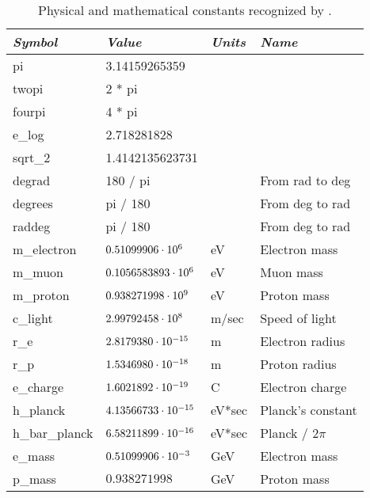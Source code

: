 {{\begin{table}
\centering
\begin{tabular}{|l|l|l|l|} \hline
  {\em Symbol}  & {\em Value}       & {\em Units} &  {\em Name}       \\ \hline
  pi            & 3.14159265359          &        &                   \\
  twopi         & 2 * pi                 &        &                   \\
  fourpi        & 4 * pi                 &        &                   \\
  e_log         & 2.718281828            &        &                   \\
  sqrt_2        & 1.4142135623731        &        &                   \\
  degrad        & 180 / pi               &        & From rad to deg   \\
  degrees       & pi / 180               &        & From deg to rad   \\
  raddeg        & pi / 180               &        & From deg to rad   \\
  m_electron    & $0.51099906 \cdot 10^{6}$   & eV     & Electron mass     \\
  m_muon        & $0.1056583893 \cdot 10^{6}$ & eV     & Muon mass         \\
  m_proton      & $0.938271998 \cdot 10^{9}$  & eV     & Proton mass       \\
  c_light       & $2.99792458 \cdot 10^{8}$   & m/sec  & Speed of light    \\
  r_e           & $2.8179380 \cdot 10^{-15}$  & m      & Electron radius   \\
  r_p           & $1.5346980 \cdot 10^{-18}$  & m      & Proton radius     \\
  e_charge      & $1.6021892 \cdot 10^{-19}$  & C      & Electron charge   \\
  h_planck      & $4.13566733 \cdot 10^{-15}$ & eV*sec & Planck's constant \\
  h_bar_planck  & $6.58211899 \cdot 10^{-16}$ & eV*sec & Planck / $2\pi$   \\
  e_mass        & $0.51099906 \cdot 10^{-3}$  & GeV    & Electron mass     \\
  p_mass        & $0.938271998$          & GeV    & Proton mass       \\ \hline
\end{tabular}
\caption{Physical and mathematical constants recognized by \bmad.}
\label{t:constants}
\end{table}

}}
